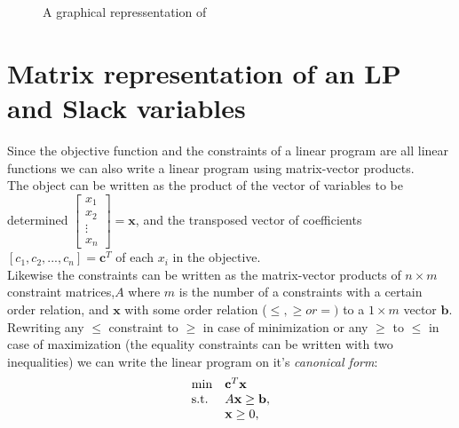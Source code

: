 \begin{figure}[H]
\caption{A graphical repressentation of }
\end{figure}
\section{Matrix representation of an LP and Slack variables}
Since the objective function and the constraints of a linear program are all linear functions we can also write a linear program using matrix-vector products. \\
The object can be written as the product of the vector of variables to be determined 
$\begin{bmatrix}x_{1} \\ x_{2} \\
\vdots \\
x_{n}
\end{bmatrix}=\textbf{x}$, and the transposed vector of coefficients $[c_1,c_2,...,c_n]=\textbf{c}^T$ of each $x_i$ in the objective.\\
Likewise the constraints can be written as the matrix-vector products of $n\times m$ constraint matrices,$A$ where $m$ is the number of a constraints with a certain order relation, and $\textbf{x}$ with some order relation ($\leq,\geq or =)$ to a $1\times m$ vector $\textbf{b}$.\\
Rewriting any $\leq$ constraint to $\geq$ in case of minimization or any $\geq$ to $\leq$ in case of maximization (the equality constraints can be written with two inequalities) we can write the linear program on it's \textit{canonical form}:
\begin{align}\label{canonicalMin}
\begin{array}{ll@{}ll}
\text{min} &\textbf{c}^T\textbf{x}&\\
\text{s.t.} &A\textbf{x} \geq \textbf{b},&\\
&\textbf{x} \geq 0,&\\
\end{array}
\end{align}
